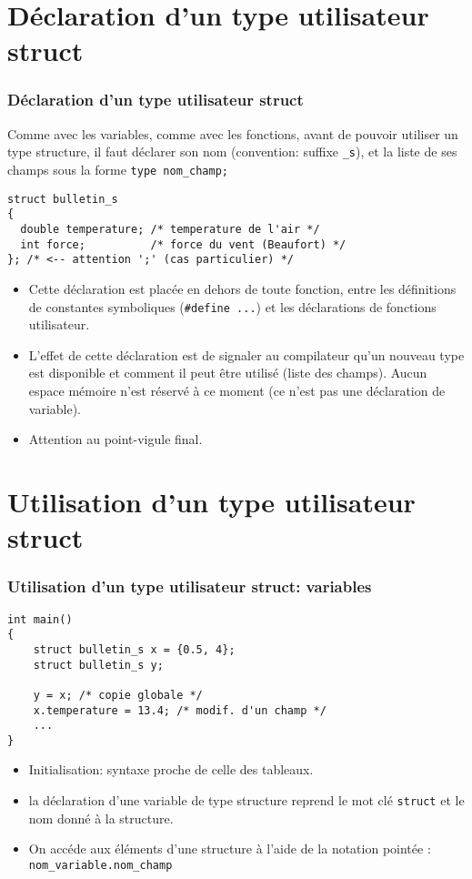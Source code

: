 \documentclass[xcolor=pdftex,svgnames,table]{beamer}
\begin{document}
\section[Déclaration]{Déclaration d'un type utilisateur struct}
\begin{frame}[fragile]
  \frametitle{Déclaration d'un type utilisateur struct}
Comme avec les variables, comme avec les fonctions, avant de pouvoir
utiliser un type structure, il faut déclarer son nom
(convention: suffixe \verb|_s|), et la liste de ses
champs sous la forme \verb|type nom_champ;|
\pause
\begin{lstlisting}[escapechar={\%},basicstyle=\ttfamily\small] 
struct bulletin_s 
{
  double temperature; /* temperature de l'air */
  int force;          /* force du vent (Beaufort) */
}; /* <-- attention ';' (cas particulier) */
\end{lstlisting}
\pause
\begin{itemize}
\item Cette déclaration est placée en dehors de toute fonction, entre
les définitions de constantes symboliques (\verb|#define ...|) et les
déclarations de fonctions utilisateur.
\pause
\item L'effet de cette déclaration est de signaler au compilateur qu'un nouveau
type est disponible et comment il peut être utilisé (liste des champs). Aucun espace mémoire n'est réservé à ce moment
(ce n'est pas une déclaration de variable).
\item \pause \alert{Attention au point-vigule final}.
\end{itemize}
\end{frame}

\section[Utilisation]{Utilisation d'un type utilisateur struct}
\begin{frame}[fragile]
  \frametitle{Utilisation d'un type utilisateur struct: variables}

\begin{lstlisting}[escapechar={\%},basicstyle=\ttfamily\small] 
int main()
{
    struct bulletin_s x = {0.5, 4};
    struct bulletin_s y;
    
    y = x; /* copie globale */
    x.temperature = 13.4; /* modif. d'un champ */
    ...
}
\end{lstlisting}
\pause
\begin{itemize}
\item Initialisation:  syntaxe proche de celle des tableaux.
\pause
\item la déclaration d'une variable de type structure reprend le mot
  clé \verb|struct| et le nom donné à la structure.
\pause
\item On accéde aux éléments d'une structure à l'aide de la notation
  pointée :
\verb|nom_variable.nom_champ|
\end{itemize}
\end{frame}
\end{document}

